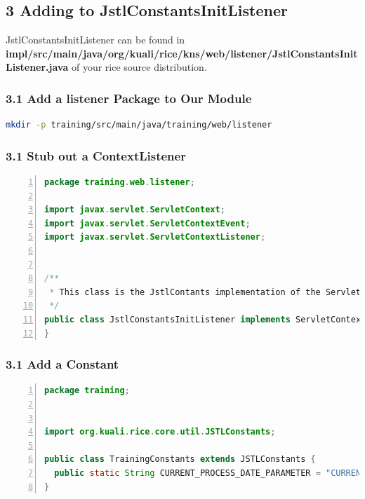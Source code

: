 \subsection*{3 Adding to JstlConstantsInitListener}
JstlConstantsInitListener can be found in
\textbf{impl/src/main/java/org/kuali/rice/kns/web/listener/JstlConstantsInitListener.java}
of your rice source distribution.

\subsubsection*{3.1 Add a listener Package to Our Module}

\begin{lstlisting}[basicstyle=\scriptsize,language=bash,backgroundcolor=\color{ubergray},caption={Directory creation for Linux
    users},frame=single,breaklines=true]
  mkdir -p training/src/main/java/training/web/listener
\end{lstlisting}

\subsubsection*{3.1 Stub out a ContextListener}
\begin{lstlisting}[basicstyle=\scriptsize,numbers=left,language=java,backgroundcolor=\color{ubergray},caption={training/web/TrainingFunctions},frame=single,breaklines=true]
package training.web.listener;

import javax.servlet.ServletContext;
import javax.servlet.ServletContextEvent;
import javax.servlet.ServletContextListener;


/**
 * This class is the JstlContants implementation of the ServletContextListener.
 */
public class JstlConstantsInitListener implements ServletContextListener {
}
\end{lstlisting}


\subsubsection*{3.1 Add a Constant}
\begin{lstlisting}[basicstyle=\scriptsize,numbers=left,language=java,backgroundcolor=\color{ubergray},caption={training/web/TrainingFunctions},frame=single,breaklines=true]
package training;


import org.kuali.rice.core.util.JSTLConstants;

public class TrainingConstants extends JSTLConstants {
  public static String CURRENT_PROCESS_DATE_PARAMETER = "CURRENT_PROCESS_DATE";
}
\end{lstlisting}

